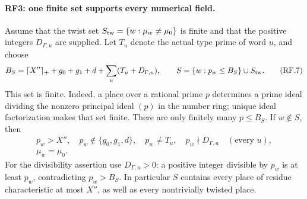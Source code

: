 \documentclass[11pt,a4paper]{article}
\numberwithin{equation}{section}
\theoremstyle{remark}\newtheorem{remark}[theorem]{Remark}
\begin{document}
\paragraph{RF3: one finite set supports every numerical field.}
Assume that the twist set
$S_{\rm tw}=\{w:\mu_w\ne\mu_0\}$ is finite and that the positive
integers $D_{\Gamma,u}$ are supplied. Let $T_u$ denote the actual type
prime of word $u$, and choose
\[
 B_S=\lceil X''\rceil_++g_0+g_1+d+
                           \sum_u(T_u+D_{\Gamma,u}),\qquad
 S=\{w:p_w\leq B_S\}\cup S_{\rm tw}.                          \tag{RF.7}
\]
This set is finite. Indeed, a place over a rational prime $p$ determines
a prime ideal dividing the nonzero principal ideal $(p)$ in the number
ring; unique ideal factorization makes that set finite. There are only
finitely many $p\leq B_S$.
If $w\notin S$, then
\[
 \begin{gathered}
 p_w>X'',\quad p_w\notin\{g_0,g_1,d\},\quad
 p_w\ne T_u,\quad p_w\nmid D_{\Gamma,u}\quad(\text{every }u),\\
                         \mu_w=\mu_0.                         \tag{RF.8}
 \end{gathered}
\]
For the divisibility assertion use $D_{\Gamma,u}>0$: a positive integer
divisible by $p_w$ is at least $p_w$, contradicting $p_w>B_S$.
In particular $S$ contains every place of residue characteristic at most
$X''$, as well as every nontrivially twisted place.
\end{document}
